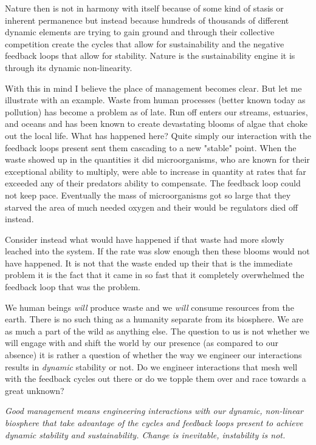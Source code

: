 \documentclass[11pt,a5paper]{book}
\begin{document}
Nature then is not in harmony with itself because of some kind of stasis or inherent permanence but instead because hundreds of thousands of different dynamic elements are trying to gain ground and through their collective competition create the cycles that allow for sustainability and the negative feedback loops that allow for stability. Nature is the sustainability engine it is through its dynamic non-linearity. \newline

With this in mind I believe the place of management becomes clear. But let me illustrate with an example. Waste from human processes (better known today as pollution) has become a problem as of late. Run off enters our streams, estuaries, and oceans and has been known to create devastating blooms of algae that choke out the local life. What has happened here? Quite simply our interaction with the feedback loops present sent them cascading to a new "stable" point. When the waste showed up in the quantities it did microorganisms, who are known for their exceptional ability to multiply, were able to increase in quantity at rates that far exceeded any of their predators ability to compensate. The feedback loop could not keep pace. Eventually the mass of microorganisms got so large that they starved the area of much needed oxygen and their would be regulators died off instead.  

Consider instead what would have happened if that waste had more slowly leached into the system. If the rate was slow enough then these blooms would not have happened. It is not that the waste ended up their that is the immediate problem it is the fact that it came in so fast that it completely overwhelmed the feedback loop that was the problem. 

We human beings \textit{will} produce waste and we \textit{will} consume resources from the earth. There is no such thing as a humanity separate from its biosphere. We are as much a part of the wild as anything else. The question to us is not whether we will engage with and shift the world by our presence (as compared to our absence) it is rather a question of whether the way we engineer our interactions results in \textit{dynamic} stability or not. Do we engineer interactions that mesh well with the feedback cycles out there or do we topple them over and race towards a great unknown? \newline 

\textit{Good management means engineering interactions with our dynamic, non-linear biosphere that take advantage of the cycles and feedback loops present to achieve dynamic stability and sustainability. Change is inevitable, instability is not.} \newline 
\end{document}

